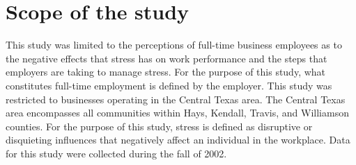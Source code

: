 \documentclass[]{article}
\begin{document}
\section{Scope of the study}
This study was limited to the perceptions of full-time business employees as to the
negative effects that stress has on work performance and the steps that employers are
taking to manage stress. For the purpose of this study, what constitutes full-time
employment is defined by the employer. This study was restricted to businesses
operating in the Central Texas area. The Central Texas area encompasses all
communities within Hays, Kendall, Travis, and Williamson counties. For the purpose
of this study, stress is defined as disruptive or disquieting influences that negatively
affect an individual in the workplace. Data for this study were collected during the fall
of 2002.
\end{document}
